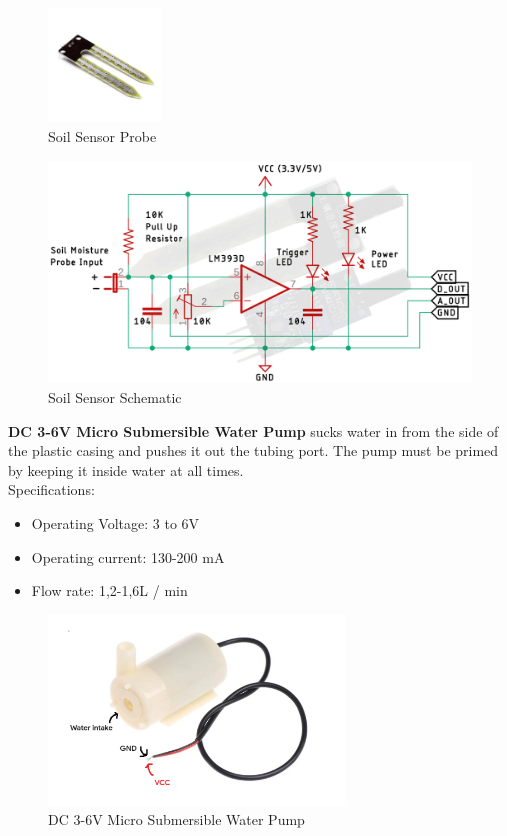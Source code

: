 \documentclass[12pt]{article}
\begin{document}
\begin{figure}[ht]
    \centering
    \includegraphics[width=0.27\textwidth]{images/image20.png}
    \caption{Soil Sensor Probe}
    \label{fig:pic12}
\end{figure} 

\newpage

\begin{figure}[ht]
    \centering
    \includegraphics[width=1\textwidth]{images/image17.png}
    \caption{Soil Sensor Schematic}
    \label{fig:pic13}
\end{figure} 

\textbf{DC 3-6V Micro Submersible Water Pump} sucks water in from the side of the plastic casing and pushes it out the tubing port. The pump must be primed by keeping it inside water at all times.\\

\hspace{1cm}Specifications: 
\begin{itemize}[leftmargin=2cm]
    \item Operating Voltage: 3 to 6V
    \item Operating current: 130-200 mA
    \item Flow rate: 1,2-1,6L / min
\end{itemize}

\begin{figure}[ht]
    \centering
    \includegraphics[width=0.7\textwidth]{images/image21.png}
    \caption{DC 3-6V Micro Submersible Water Pump}
    \label{fig:pic14}
\end{figure} 
\end{document}
